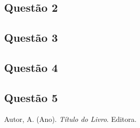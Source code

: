\documentclass{article}
\begin{document}
\subsection*{Questão 2}
\subsection*{Questão 3}
\subsection*{Questão 4}
\subsection*{Questão 5}

\begin{thebibliography}{99}

Autor, A. (Ano). \textit{Título do Livro}. Editora.

\end{thebibliography}
\end{document}
